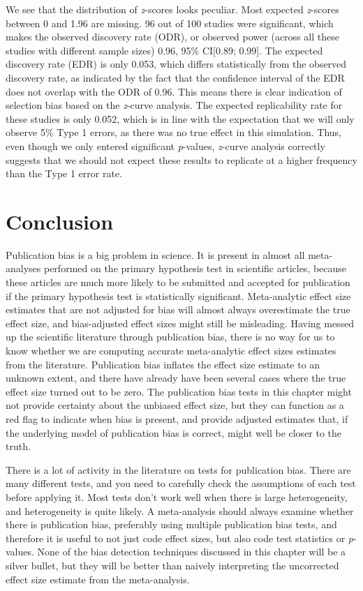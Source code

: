 \documentclass[
  oneside]{krantz}
\begin{document}
We see that the distribution of \emph{z}-scores looks peculiar. Most expected \emph{z}-scores between 0 and 1.96 are missing. 96 out of 100 studies were significant, which makes the observed discovery rate (ODR), or observed power (across all these studies with different sample sizes) 0.96, 95\% CI{[}0.89; 0.99{]}. The expected discovery rate (EDR) is only 0.053, which differs statistically from the observed discovery rate, as indicated by the fact that the confidence interval of the EDR does not overlap with the ODR of 0.96. This means there is clear indication of selection bias based on the \emph{z}-curve analysis. The expected replicability rate for these studies is only 0.052, which is in line with the expectation that we will only observe 5\% Type 1 errors, as there was no true effect in this simulation. Thus, even though we only entered significant \emph{p}-values, \emph{z}-curve analysis correctly suggests that we should not expect these results to replicate at a higher frequency than the Type 1 error rate.

\hypertarget{conclusion}{%
\section{Conclusion}\label{conclusion}}

Publication bias is a big problem in science. It is present in almost all meta-analyses performed on the primary hypothesis test in scientific articles, because these articles are much more likely to be submitted and accepted for publication if the primary hypothesis test is statistically significant. Meta-analytic effect size estimates that are not adjusted for bias will almost always overestimate the true effect size, and bias-adjusted effect sizes might still be misleading. Having messed up the scientific literature through publication bias, there is no way for us to know whether we are computing accurate meta-analytic effect sizes estimates from the literature. Publication bias inflates the effect size estimate to an unknown extent, and there have already have been several cases where the true effect size turned out to be zero. The publication bias tests in this chapter might not provide certainty about the unbiased effect size, but they can function as a red flag to indicate when bias is present, and provide adjusted estimates that, if the underlying model of publication bias is correct, might well be closer to the truth.

There is a lot of activity in the literature on tests for publication bias. There are many different tests, and you need to carefully check the assumptions of each test before applying it. Most tests don't work well when there is large heterogeneity, and heterogeneity is quite likely. A meta-analysis should always examine whether there is publication bias, preferably using multiple publication bias tests, and therefore it is useful to not just code effect sizes, but also code test statistics or \emph{p}-values. None of the bias detection techniques discussed in this chapter will be a silver bullet, but they will be better than naively interpreting the uncorrected effect size estimate from the meta-analysis.
\end{document}
